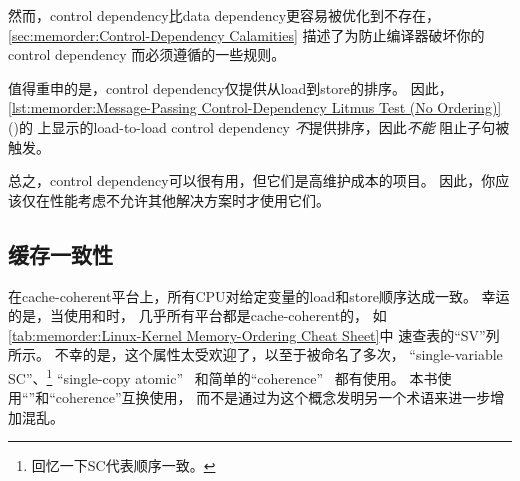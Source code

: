 然而，control dependency比data dependency更容易被优化到不存在，
\cref{sec:memorder:Control-Dependency Calamities}
描述了为防止编译器破坏你的control dependency
而必须遵循的一些规则。

\begin{listing}

\caption{消息传递Control Dependency Litmus Test（无排序）}
\label{lst:memorder:Message-Passing Control-Dependency Litmus Test (No Ordering)}
\end{listing}

\begin{fcvref}
值得重申的是，control dependency仅提供从load到store的排序。
因此，\cref{lst:memorder:Message-Passing Control-Dependency Litmus Test (No Ordering)}
()的
上显示的load-to-load control dependency
\emph{不}提供排序，因此\emph{不能}
阻止子句被触发。
\end{fcvref}

总之，control dependency可以很有用，但它们是高维护成本的项目。
因此，你应该仅在性能考虑不允许其他解决方案时才使用它们。

\QuickQuizEnd

\subsection{缓存一致性}
\label{sec:memorder:Cache Coherence}

在cache-coherent平台上，所有CPU对给定变量的load和store顺序达成一致。
幸运的是，当使用和时，
几乎所有平台都是cache-coherent的，
如\cref{tab:memorder:Linux-Kernel Memory-Ordering Cheat Sheet}中
速查表的``SV''列所示。
不幸的是，这个属性太受欢迎了，以至于被命名了多次，
``single-variable SC''、\footnote{
	回忆一下SC代表顺序一致。}
``single-copy atomic''~\cite{Stone:1995:SP:623262.623912}
和简单的``coherence''~\cite{JadeAlglave2011ppcmem}
都有使用。
本书使用``''和``coherence''互换使用，
而不是通过为这个概念发明另一个术语来进一步增加混乱。

\begin{listing}

\caption{缓存一致性 IRIW 石蕊测试}
\label{lst:memorder:Cache-Coherent IRIW Litmus Test}
\end{listing}

